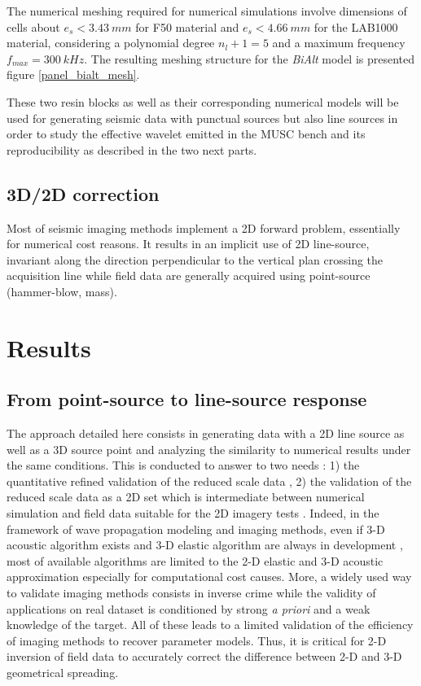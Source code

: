 \documentclass[manuscript,revised]{geophysics}
\newcommand{\twod}{2-D }
\newcommand{\thrd}{3-D }
\newcommand{\bialt}{\textit{BiAlt} }
\begin{document}
\noindent The numerical meshing required for numerical simulations involve dimensions of cells about $e_{s}<3.43\ mm$ for F50 material and $e_{s}<4.66\ mm$ for the LAB1000 material, considering a polynomial degree $n_{l}+1=5$ and a maximum frequency $f_{max}=300\ kHz$. The resulting meshing structure for the \bialt model is presented figure \ref{panel_bialt_mesh}.

\noindent These two resin blocks as well as their corresponding numerical models will be used for generating seismic data with punctual sources but also line sources in order to study the effective wavelet emitted in the MUSC bench and its reproducibility as described in the two next parts.

\subsection{3D/2D correction}

\noindent Most of seismic imaging methods implement a 2D forward problem, essentially for numerical cost reasons. It results in an implicit use of 2D line-source, invariant along the direction perpendicular to the vertical plan crossing the acquisition line while field data are generally acquired using point-source (hammer-blow, mass).

\section{Results}

\subsection{From point-source to line-source response}


\noindent The approach detailed here consists in generating data with a 2D line source as well as a 3D source point and analyzing the similarity to numerical results under the same conditions. This is conducted to answer to two needs : 1) the quantitative refined validation of the reduced scale data , 2) the validation of the reduced scale data as a 2D set which is intermediate between numerical simulation and field data suitable for the 2D imagery tests . Indeed, in the framework of wave propagation modeling and imaging methods, even if \thrd acoustic algorithm exists \citep{benhadjali_FWI_2008,plessix_FWI_2010} and \thrd elastic algorithm are always in development \citep{castellanos_AMD_2011,Borisov_FWI_2015}, most of available algorithms are limited to the \twod elastic and \thrd acoustic approximation especially for computational cost causes. More, a widely used way to validate imaging methods consists in inverse crime while the validity of applications on real dataset is conditioned by strong \textit{a priori} and a weak knowledge of the target. All of these leads to a limited validation of the efficiency of imaging methods to recover parameter models. Thus, it is critical for \twod inversion of field data to accurately correct the difference between \twod and \thrd geometrical spreading.
\end{document}
